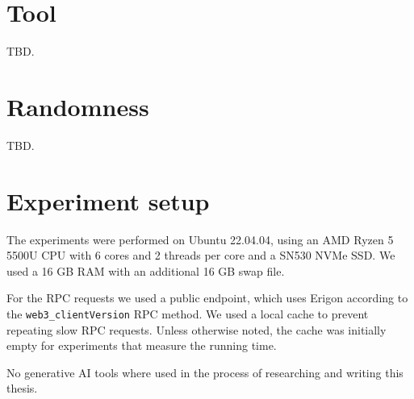 \documentclass[draft,final]{vutinfth} %
\begin{document}
\section{Tool}

TBD.

\section{Randomness}

TBD.

\section{Experiment setup}

The experiments were performed on Ubuntu 22.04.04, using an AMD Ryzen 5 5500U CPU with 6 cores and 2 threads per core and a SN530 NVMe SSD. We used a 16 GB RAM with an additional 16 GB swap file.

For the RPC requests we used a public endpoint\cite{noauthor_pokt_2024}, which uses Erigon\cite{noauthor_rpc_2024} according to the \verb|web3_clientVersion| RPC method. We used a local cache to prevent repeating slow RPC requests. \cite{fuzzland_eth_2024} Unless otherwise noted, the cache was initially empty for experiments that measure the running time.

\backmatter

\begin{aitools}
    No generative AI tools where used in the process of researching and writing this thesis.
\end{aitools}

\listoffigures %

\cleardoublepage %
\listoftables %

\listofalgorithms
{}

\printindex

\printglossaries



\end{document}
